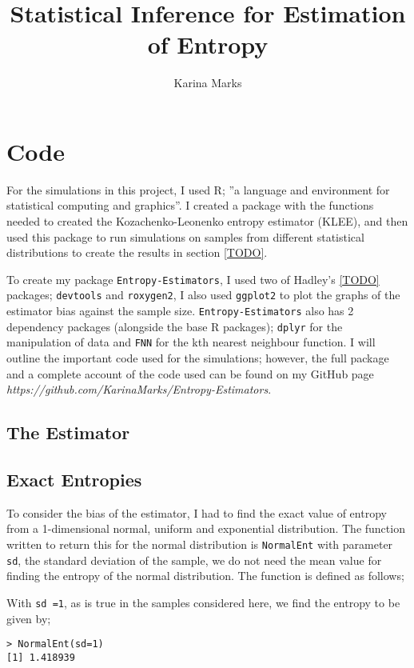 \documentclass{report}
\title{Statistical Inference for Estimation of Entropy}
\author{Karina Marks}
\begin{document}
\chapter{Code}

For the simulations in this project, I used R; ''a language and environment for statistical computing and graphics''. %
I created a package with the functions needed to created the Kozachenko-Leonenko entropy estimator (KLEE), and then used this package to run simulations on samples from different statistical distributions to create the results in section \ref{TODO}.

To create my package \texttt{Entropy-Estimators}, I used two of Hadley's \ref{TODO} packages; \texttt{devtools} and \texttt{roxygen2}, I also used \texttt{ggplot2} to plot the graphs of the estimator bias against the sample size.  \texttt{Entropy-Estimators} also has 2 dependency packages (alongside the base R packages); \texttt{dplyr} for the manipulation of data and \texttt{FNN} for the kth nearest neighbour function. I will outline the important code used for the simulations; however, the full package and a complete account of the code used can be found on my GitHub page \textit{https://github.com/KarinaMarks/Entropy-Estimators}.

\section{The Estimator}

\section{Exact Entropies}

To consider the bias of the estimator, I had to find the exact value of entropy from a 1-dimensional normal, uniform and exponential distribution. The function written to return this for the normal distribution is \texttt{NormalEnt} with parameter \texttt{sd}, the standard deviation of the sample, we do not need the mean value for finding the entropy of the normal distribution. The function is defined as follows;



With \texttt{sd =1}, as is true in the samples considered here, we find the entropy to be given by;

\begin{verbatim}
> NormalEnt(sd=1)
[1] 1.418939
\end{verbatim}
\end{document}
